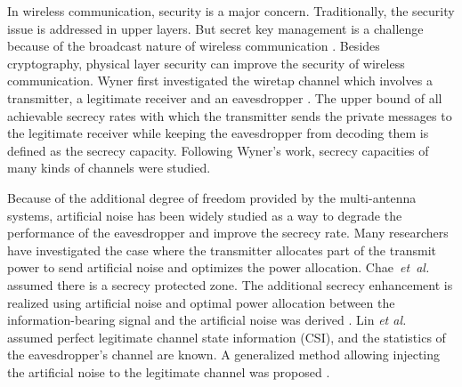 \documentclass[journal]{IEEEtran}
\begin{document}
In wireless communication, security is a major concern. Traditionally, the security issue is addressed in upper layers. But secret key management is a challenge because of the broadcast nature of wireless communication \cite{liang2009information}. Besides cryptography, physical layer security can improve the security of wireless communication. Wyner first investigated the wiretap channel which involves a transmitter, a legitimate receiver and an eavesdropper \cite{wyner1975wire}. The upper bound of all achievable secrecy rates with which the transmitter sends the private messages to the legitimate receiver while keeping the eavesdropper from decoding them is defined as the secrecy capacity. Following Wyner's work, secrecy capacities of many kinds of channels were studied\cite{leung1978gaussian,liang2008secure,tekin2008general}. 

Because of the additional degree of freedom provided by the multi-antenna systems, artificial noise has been widely studied as a way to degrade the performance of the eavesdropper and improve the secrecy rate. Many researchers have investigated the case where the transmitter allocates part of the transmit power to send artificial noise and optimizes the power allocation. Chae~\emph{et~al.} assumed there is a secrecy protected zone. The additional secrecy enhancement is realized using artificial noise and optimal power allocation between the information-bearing signal and the artificial noise was derived \cite{chae2014enhanced}. Lin \emph{et al.} assumed perfect legitimate channel state information (CSI), and the statistics of the eavesdropper's channel are known. A generalized method allowing injecting the artificial noise to the legitimate channel was proposed \cite{lin2013secrecy}.
\end{document}
